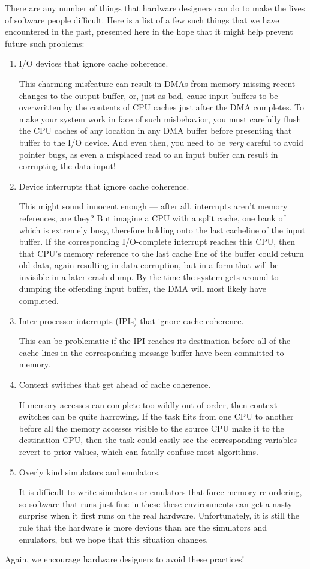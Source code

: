 There are any number of things that hardware designers can do
to make the lives of software people difficult.
Here is a list of a few such things that we have encountered in
the past, presented here in the hope that it might help prevent
future such problems:
\begin{enumerate}
\item	I/O devices that ignore cache coherence.

	This charming misfeature can result in DMAs from memory
	missing recent changes to the output buffer, or, just as
	bad, cause input buffers to be overwritten by the contents
	of CPU caches just after the DMA completes.
	To make your system work in face of such misbehavior,
	you must carefully flush the CPU caches of any location
	in any DMA buffer before presenting that buffer to the
	I/O device.
	And even then, you need to be \emph{very} careful to avoid
	pointer bugs, as even a misplaced read to an input buffer
	can result in corrupting the data input!

\item	Device interrupts that ignore cache coherence.

	This might sound innocent enough --- after all, interrupts
	aren't memory references, are they?
	But imagine a CPU with a split cache, one bank of which is
	extremely busy, therefore holding onto the last cacheline
	of the input buffer.
	If the corresponding I/O-complete interrupt reaches this
	CPU, then that CPU's memory reference to the last cache
	line of the buffer could return old data, again resulting
	in data corruption, but in a form that will be invisible
	in a later crash dump.
	By the time the system gets around to dumping the offending
	input buffer, the DMA will most likely have completed.

\item	Inter-processor interrupts (IPIs) that ignore cache coherence.

	This can be problematic if the IPI reaches its destination
	before all of the cache lines in the corresponding message
	buffer have been committed to memory.

\item	Context switches that get ahead of cache coherence.

	If memory accesses can complete too wildly out of order,
	then context switches can be quite harrowing.
	If the task flits from one CPU to another before all the
	memory accesses visible to the source CPU make it to the
	destination CPU, then the task could easily see the corresponding
	variables revert to prior values, which can fatally confuse
	most algorithms.

\item	Overly kind simulators and emulators.

	It is difficult to write simulators or emulators that force
	memory re-ordering, so software that runs just fine in these
	these environments can get a nasty surprise when it first
	runs on the real hardware.
	Unfortunately, it is still the rule that the hardware is more
	devious than are the simulators and emulators, but we hope that
	this situation changes.
\end{enumerate}

Again, we encourage hardware designers to avoid these practices!
